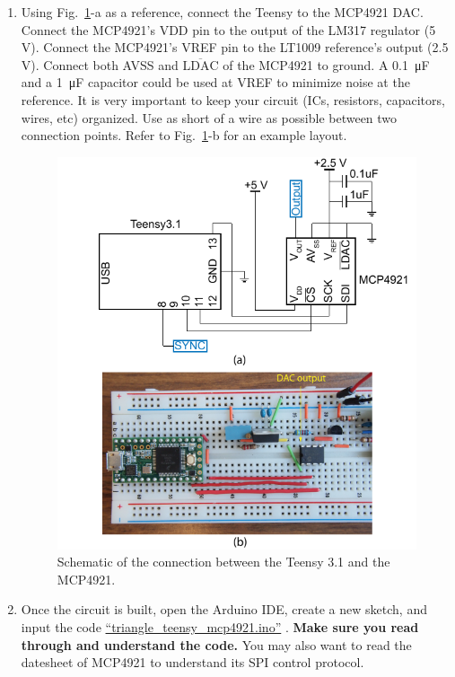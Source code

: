 \documentclass[letterpaper, 11pt]{article}
\begin{document}
\begin{enumerate}
	\item Using Fig.~\ref{fig:dac-sch}-a as a reference, connect the Teensy to the MCP4921 DAC. Connect the MCP4921's VDD pin to the output of the LM317 regulator (5\,V). Connect the MCP4921's VREF pin to the LT1009 reference's output (2.5\,V). Connect both AVSS and $\overline{\text{LDAC}}$ of the MCP4921 to ground. A \SI{0.1}{\micro\farad} and a \SI{1}{\micro\farad} capacitor could be used at VREF to minimize noise at the reference. It is very important to keep your circuit (ICs, resistors, capacitors, wires, etc) organized. Use as short of a wire as possible between two connection points. Refer to Fig.~\ref{fig:dac-sch}-b for an example layout.
	
	\begin{figure}[h]
		\centering
		\includegraphics{dac-sch}
		\caption{Schematic of the connection between the Teensy 3.1 and the MCP4921.}
		\label{fig:dac-sch}
	\end{figure}

\item Once the circuit is built, open the Arduino IDE, create a new sketch, and input the code \href{https://github.com/ucdart/UCD-EEC134/blob/master/labs/lab1/code/triangle_teensy_mcp4921/triangle_teensy_mcp4921.ino}{``triangle\_teensy\_mcp4921.ino''} . \textbf{Make sure you read through and understand the code.} You may also want to read the datesheet of MCP4921 to understand its SPI control protocol. 


\end{enumerate}
\end{document}
